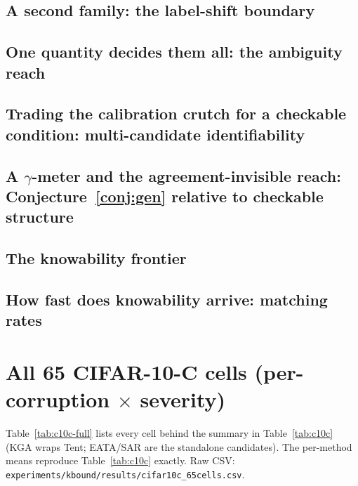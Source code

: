 \documentclass[conference]{IEEEtran}
\theoremstyle{plain}
\theoremstyle{definition}
\begin{document}
\subsection{A second family: the label-shift boundary}\label{sec:lsslice}


\subsection{One quantity decides them all: the ambiguity reach}\label{sec:unify}



\subsection{Trading the calibration crutch for a checkable condition: multi-candidate identifiability}\label{sec:multicand}



\subsection{A $\gamma$-meter and the agreement-invisible reach: Conjecture~\ref{conj:gen} relative to checkable structure}\label{sec:gmeter}


\subsection{The knowability frontier}\label{sec:frontier}


\subsection{How fast does knowability arrive: matching rates}\label{sec:rates}




\section{All 65 CIFAR-10-C cells (per-corruption $\times$ severity)}\label{app:c10c}
Table~\ref{tab:c10c-full} lists every cell behind the summary in Table~\ref{tab:c10c}
(\textsc{KGA} wraps Tent; EATA/SAR are the standalone candidates). The per-method means
reproduce Table~\ref{tab:c10c} exactly. Raw CSV:
\texttt{experiments/kbound/results/cifar10c\_65cells.csv}.
\onecolumn

\twocolumn
\end{document}
